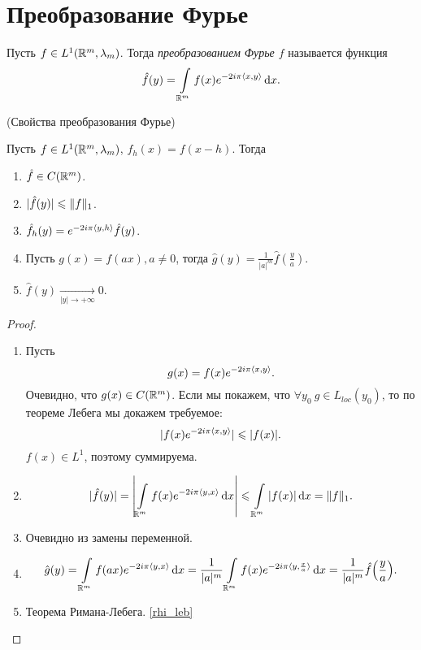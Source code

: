 \section{Преобразование Фурье}

\begin{definition}
    Пусть $f \in L^1(\mathbb{R}^m, \lambda_m)$. Тогда \textit{преобразованием
    Фурье $f$} называется функция
    \[
        \hat{f}(y) = \int\limits_{\mathbb{R}^m}{f(x) e^{-2i\pi\langle x, y \rangle} \,\mathrm{d} x}
    .\]
\end{definition}

\begin{theorem}(Свойства преобразования Фурье)

    Пусть $f \in L^1(\mathbb{R}^m, \lambda_m)$, $f_h(x) = f(x - h)$. Тогда
    \begin{enumerate}
        \item $\hat{f} \in C(\mathbb{R}^m)$.
        \item $|\hat{f}(y)| \leqslant \lVert f\rVert_1$.
        \item $\hat{f}_h(y) = e^{-2i\pi \langle y, h \rangle} \hat{f}(y)$.
        \item Пусть $g(x) = f(ax), a \neq 0$, тогда $\hat{g}(y) = 
            \frac{1}{|a|^m}\hat{f}(\frac{y}{a})$.
        \item $\hat{f}(y) \xrightarrow[|y| \to +\infty]{} 0$.
    \end{enumerate}
\end{theorem}
\begin{proof}
    \enewline
    \begin{enumerate}
        \item Пусть
            \[
                g(x) = f(x) e^{-2i\pi \langle x, y \rangle}
            .\]
            Очевидно, что $g(x) \in C(\mathbb{R}^m)$. Если мы покажем, что
            $\forall y_0~ g \in L_{loc}(y_0)$, то по теореме Лебега
            мы докажем требуемое:
            \[
                |f(x) e^{-2i\pi\langle x, y \rangle}| \leqslant |f(x)|
            .\]
            $f(x) \in L^1$, поэтому суммируема.
        \item
            \[
                |\hat{f}(y)| = \abs*{\intl_{\Rm}{f(x) e^{-2i\pi \scp{y}{x}} \dd x}}
                \leqslant \intl_{\Rm}{\abs*{f(x)} \dd x} = \norm{f}_1
            .\]
        \item Очевидно из замены переменной.
        \item \begin{align*}
                \hat{g}(y) = \intl_{\Rm}{f(ax) e^{-2i\pi\scp{y}{x}} \dd x} =
                \frac{1}{|a|^m} \intl_{\Rm}{f(x) e^{-2i\pi\scp{y}{\frac{x}{a}}} \dd x} =
                \frac{1}{|a|^m} \hat{f}\parens*{\frac{y}{a}}
            .\end{align*} 
        \item Теорема Римана-Лебега. \ref{rhi_leb} 
    \end{enumerate}
\end{proof}

